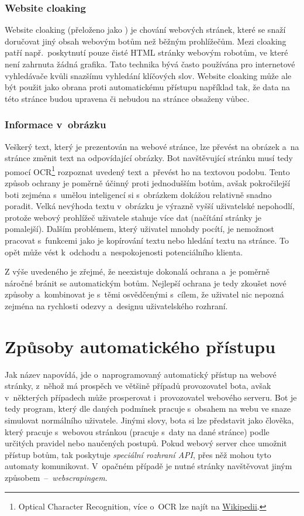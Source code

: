 \subsection*{Website cloaking}
Website cloaking (přeloženo jako \textit{}) je chování webových stránek, které se snaží doručovat jiný obsah webovým botům než běžným prohlížečům. Mezi cloaking patří např.~poskytnutí pouze čisté HTML stránky webovým robotům, ve které není zahrnuta žádná grafika. Tato technika bývá často používána pro internetové vyhledávače kvůli snazšímu vyhledání klíčových slov. Website cloaking může ale být použit jako obrana proti automatickému přístupu například tak, že data na této stránce budou upravena či nebudou na stránce obsaženy vůbec.

\subsection*{Informace v~obrázku}
Veškerý text, který je prezentován na webové stránce, lze převést na obrázek a~na stránce změnit text na odpovídající obrázky. Bot navštěvující stránku musí tedy pomocí OCR\footnote{Optical Character Recognition, více o~OCR lze najít na \href{https://en.wikipedia.org/wiki/Optical_character_recognition}{Wikipedii}.} rozpoznat uvedený text a~převést ho na textovou podobu. Tento způsob ochrany je poměrně účinný proti jednodušším botům, avšak pokročilejší boti zejména s~umělou inteligencí si s~obrázkem dokážou relativně snadno poradit. Velká nevýhoda textu v~obrázku je výrazně vyšší uživatelské nepohodlí, protože webový prohlížeč uživatele stahuje více dat (načítání stránky je pomalejší). Dalším problémem, který uživatel mnohdy pocítí, je nemožnost pracovat s~funkcemi jako je kopírování textu nebo hledání textu na stránce. To opět může vést k~odchodu a~nespokojenosti potenciálního klienta.

\bigskip

Z výše uvedeného je zřejmé, že neexistuje dokonalá ochrana a~je poměrně náročné bránit se automatickým botům. Nejlepší ochrana je tedy zkoušet nové způsoby a~kombinovat je s~těmi osvědčenými s~cílem, že uživatel nic nepozná zejména na rychlosti odezvy a~designu uživatelského rozhraní. 

\chapter{Způsoby automatického přístupu}
\label{chap:auto_approach_to_web}
Jak název napovídá, jde o~naprogramovaný automatický přístup na webové stránky, z~něhož má prospěch ve většině případů provozovatel bota, avšak v~některých případech může prosperovat i~provozovatel webového serveru. Bot je tedy program, který dle daných podmínek pracuje s~obsahem na webu ve snaze simulovat normálního uživatele. Jinými slovy, bota si lze představit jako člověka, který pracuje s~webovou stránkou (pracuje s~daty na dané stránce) podle určitých pravidel nebo naučených postupů. Pokud webový server chce umožnit přístup botům, tak poskytuje \textit{speciální rozhraní API}, přes něž mohou tyto automaty komunikovat. V~opačném případě je nutné stránky navštěvovat jiným způsobem~--~\textit{webscrapingem}.

